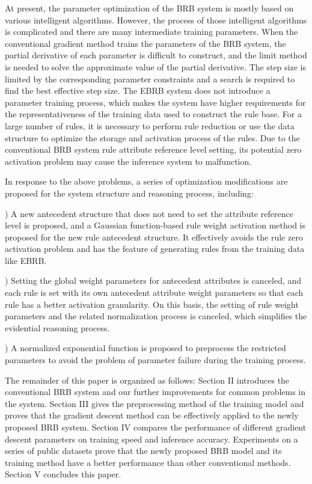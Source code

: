 \documentclass{ieeeaccess}
\begin{document}
At present, the parameter optimization of the BRB system is mostly based on various intelligent algorithms.
However, the process of those intelligent algorithms is complicated and there are many intermediate training parameters.
When the conventional gradient method trains the parameters of the BRB system, the partial derivative of each parameter is difficult to construct,
and the limit method is needed to solve the approximate value of the partial derivative\cite{a13}.
The step size is limited by the corresponding parameter constraints and a search is required to find the best effective step size\cite{a11,a12,a13}.
The EBRB system does not introduce a parameter training process, which makes the system have higher requirements for the representativeness of the training data used to construct the rule base.
For a large number of rules, it is necessary to perform rule reduction or use the data structure to optimize the storage and activation process of the rules.
Due to the conventional BRB system rule attribute reference level setting, its potential zero activation problem may cause the inference system to malfunction.

In response to the above problems, a series of optimization modifications are proposed for the system structure and reasoning process, including:

) A new antecedent structure that does not need to set the attribute reference level is proposed, and a Gaussian function-based
rule weight activation method is proposed for the new rule antecedent structure. It effectively avoids the rule zero activation problem and has the feature of
generating rules from the training data like EBRB.

) Setting the global weight parameters for antecedent attributes is canceled,
and each rule is set with its own antecedent attribute weight parameters so that each rule has a better activation granularity.
On this basis, the setting of rule weight parameters and the related normalization process is canceled,
which simplifies the evidential reasoning process.

) A normalized exponential function is proposed to preprocess the restricted parameters to
avoid the problem of parameter failure during the training process.

The remainder of this paper is organized as follows: Section II introduces the conventional BRB system and our further improvements for common problems in the system.
Section III gives the preprocessing method of the training model and proves that the gradient descent method can be effectively applied to the newly proposed BRB system.
Section IV compares the performance of different gradient descent parameters on training speed and inference accuracy. Experiments on a series of public datasets prove that
the newly proposed BRB model and its training method have a better performance than other conventional methods. Section V concludes this paper.
\end{document}
